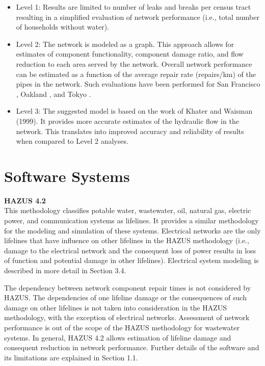 \begin{itemize}
    \item Level 1: Results are limited to number of leaks and breaks per census tract resulting in a simplified evaluation of network performance (i.e., total number of households without water).
    \item Level 2: The network is modeled as a graph. This approach allows for estimates of component functionality, component damage ratio, and flow reduction to each area served by the network. Overall network performance can be estimated as a function of the average repair rate (repairs/km) of the pipes in the network. Such evaluations have been performed for San Francisco \citep{markov1994evaluation}, Oakland \citep{geengineeringsystems1994nibs}, and Tokyo \citep{isoyama1982reliability}.
    \item Level 3: The suggested model is based on the work of Khater and Waisman (1999). It provides more accurate estimates of the hydraulic flow in the network. This translates into improved accuracy and reliability of results when compared to Level 2 analyses.
\end{itemize}

\section{Software Systems}
\label{sec:perf_pipeline_tools}

\noindent\textbf{HAZUS 4.2} \\This methodology classifies potable water, wastewater, oil, natural gas, electric power, and communication systems as lifelines. It provides a similar methodology for the modeling and simulation of these systems. Electrical networks are the only lifelines that have influence on other lifelines in the HAZUS methodology (i.e., damage to the electrical network and the consequent loss of power results in loss of function and potential damage in other lifelines). Electrical system modeling is described in more detail in Section 3.4.

The dependency between network component repair times is not considered by HAZUS. The dependencies of one lifeline damage or the consequences of such damage on other lifelines is not taken into consideration in the HAZUS methodology, with the exception of electrical networks. Assessment of network performance is out of the scope of the HAZUS methodology for wastewater systems. In general, HAZUS 4.2 allows estimation of lifeline damage and consequent reduction in network performance. Further details of the software and its limitations are explained in Section 1.1.
\newline

